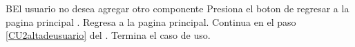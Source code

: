 		\begin{UCtrayectoriaA}{B}{El usuario no desea agregar otro componente}
			\UCpaso[\UCactor] Presiona el boton de regresar a la pagina principal .
			\UCpaso Regresa a la pagina principal.			
			\UCpaso Continua en el paso \ref{CU2altadeusuario} del .
			\UCpaso[] Termina el caso de uso.
		\end{UCtrayectoriaA}
		
